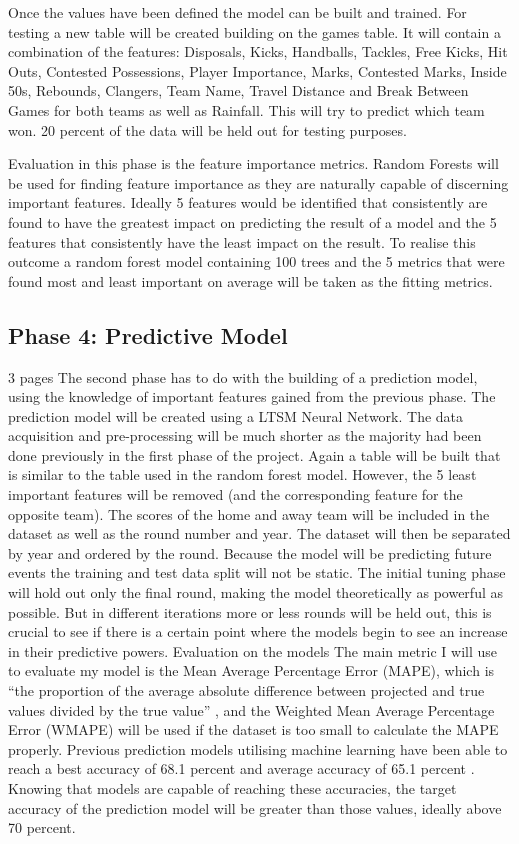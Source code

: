 \documentclass{imc-inf}
\begin{document}
	Once the values have been defined the model can be built and trained. 
	For testing a new table will be created building on the games table. It will contain a combination of the features: Disposals, Kicks, Handballs, Tackles, Free Kicks, Hit Outs, Contested Possessions, Player Importance, Marks, Contested Marks, Inside 50s, Rebounds, Clangers, Team Name, Travel Distance and Break Between Games for both teams as well as Rainfall. This will try to predict which team won. 20 percent of the data will be held out for testing purposes.
	
	Evaluation in this phase is the feature importance metrics. Random Forests will be used for finding feature importance as they are naturally capable of discerning important features. 
	Ideally 5 features would be identified that consistently are found to have the greatest impact on predicting the result of a model and the 5 features that consistently have the least impact on the result. To realise this outcome a random forest model containing 100 trees and the 5 metrics that were found most and least important on average will be taken as the fitting metrics.
	
	
	\subsection{Phase 4: Predictive Model}
	3 pages
	The second phase has to do with the building of a prediction model, using the knowledge of important features gained from the previous phase.
	The prediction model will be created using a LTSM Neural Network. The data acquisition and pre-processing will be much shorter as the majority had been done previously in the first phase of the project. Again a table will be built that is similar to the table used in the random forest model. However, the 5 least important features will be removed (and the corresponding feature for the opposite team). The scores of the home and away team will be included in the dataset as well as the round number and year.
	The dataset will then be separated by year and ordered by the round.
	Because the model will be predicting future events the training and test data split will not be static. The initial tuning phase will hold out only the final round, making the model theoretically as powerful as possible. But in different iterations more or less rounds will be held out, this is crucial to see if there is a certain point where the models begin to see an increase in their predictive powers.
	Evaluation on the models 
	The main metric I will use to evaluate my model is the Mean Average Percentage Error (MAPE), which is “the proportion of the average absolute difference between projected and true values divided by the true value” \cite{website:AIM}, and the Weighted Mean Average Percentage Error (WMAPE) will be used if the dataset is too small to calculate the MAPE properly. Previous prediction models utilising machine learning have been able to reach a best accuracy of 68.1 percent and average accuracy of 65.1 percent \cite{AFL_1}. Knowing that models are capable of reaching these accuracies, the target accuracy of the prediction model will be greater than those values, ideally above 70 percent.
	
\end{document}
